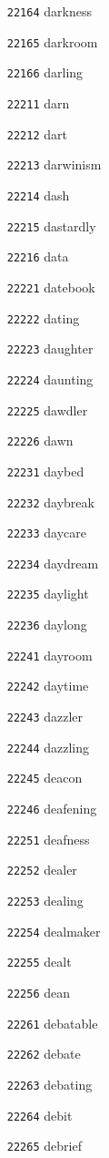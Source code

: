 \documentclass[twoside,11pt]{article}
\begin{document}
\begin{multicols}{5}
\begin{enumerate}
\item[\texttt{22164}] darkness
\item[\texttt{22165}] darkroom
\item[\texttt{22166}] darling
\item[\texttt{22211}] darn
\item[\texttt{22212}] dart
\item[\texttt{22213}] darwinism
\item[\texttt{22214}] dash
\item[\texttt{22215}] dastardly
\item[\texttt{22216}] data
\item[\texttt{22221}] datebook
\item[\texttt{22222}] dating
\item[\texttt{22223}] daughter
\item[\texttt{22224}] daunting
\item[\texttt{22225}] dawdler
\item[\texttt{22226}] dawn
\item[\texttt{22231}] daybed
\item[\texttt{22232}] daybreak
\item[\texttt{22233}] daycare
\item[\texttt{22234}] daydream
\item[\texttt{22235}] daylight
\item[\texttt{22236}] daylong
\item[\texttt{22241}] dayroom
\item[\texttt{22242}] daytime
\item[\texttt{22243}] dazzler
\item[\texttt{22244}] dazzling
\item[\texttt{22245}] deacon
\item[\texttt{22246}] deafening
\item[\texttt{22251}] deafness
\item[\texttt{22252}] dealer
\item[\texttt{22253}] dealing
\item[\texttt{22254}] dealmaker
\item[\texttt{22255}] dealt
\item[\texttt{22256}] dean
\item[\texttt{22261}] debatable
\item[\texttt{22262}] debate
\item[\texttt{22263}] debating
\item[\texttt{22264}] debit
\item[\texttt{22265}] debrief

\end{enumerate}
\end{multicols}
\end{document}
